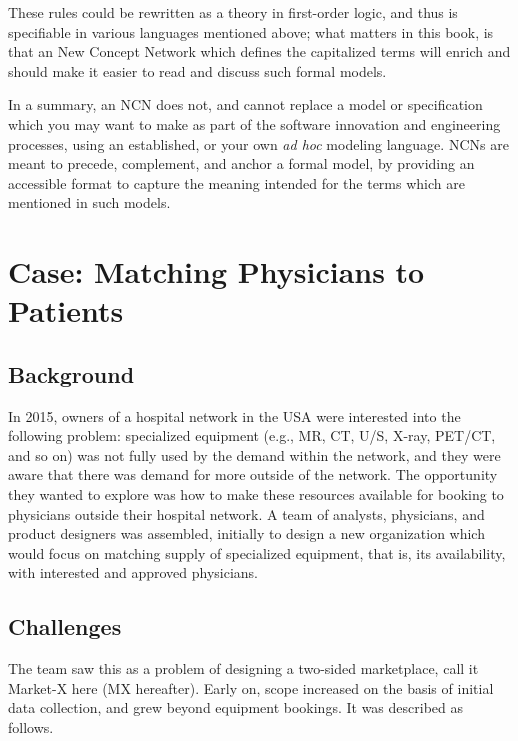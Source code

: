 \documentclass[graybox,envcountchap,sectrefs]{svmono}
\newcommand{\ncn}{NCN}
\newcommand{\ncnf}{New Concept Network}
\begin{document}
These rules could be rewritten as a theory in first-order logic, and thus is specifiable in various languages mentioned above; what matters in this book, is that an \ncnf{} which defines the capitalized terms will enrich and should make it easier to read and discuss such formal models.

In a summary, an \ncn{} does not, and cannot replace a model or specification which you may want to make as part of the software innovation and engineering processes, using an established, or your own \textit{ad hoc} modeling language. \ncn s are meant to precede, complement, and anchor a formal model, by providing an accessible format to capture the meaning intended for the terms which are mentioned in such models. 

\printbibliography


\chapter{Case: Matching Physicians to Patients}\label{c:case:matching-physicians-to-patients}

\section{Background}
In 2015, owners of a hospital network in the USA were interested into the following problem: specialized equipment (e.g., MR, CT, U/S, X-ray, PET/CT, and so on) was not fully used by the demand within the network, and they were aware that there was demand for more outside of the network. The opportunity they wanted to explore was how to make these resources available for booking to physicians outside their hospital network. A team of analysts, physicians, and product designers was assembled, initially to design a new organization which would focus on matching supply of specialized equipment, that is, its availability, with interested and approved physicians. 

\section{Challenges}
The team saw this as a problem of designing a two-sided marketplace, call it Market-X here (MX hereafter). Early on, scope increased on the basis of initial data collection, and grew beyond equipment bookings. It was described as follows.
\end{document}
